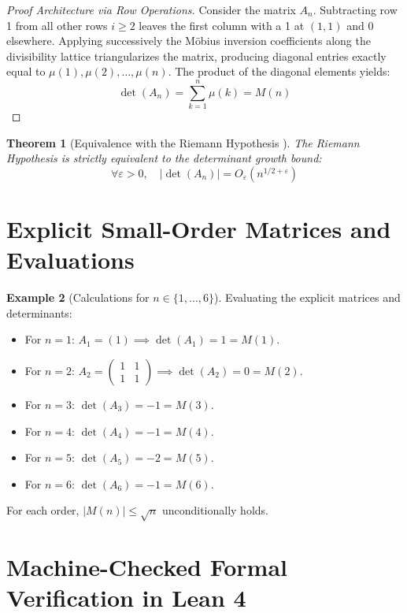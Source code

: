 \documentclass[11pt,a4paper]{article}
\newtheorem{theorem}{Theorem}[section]
\theoremstyle{definition}
\newtheorem{example}[theorem]{Example}
\begin{document}
\begin{proof}[Proof Architecture via Row Operations]
Consider the matrix $A_n$. Subtracting row 1 from all other rows $i \ge 2$ leaves the first column with a 1 at $(1, 1)$ and 0 elsewhere.
Applying successively the M\"obius inversion coefficients along the divisibility lattice triangularizes the matrix, producing diagonal entries exactly equal to $\mu(1), \mu(2), \dots, \mu(n)$.
The product of the diagonal elements yields:
\[ \det(A_n) = \sum_{k=1}^n \mu(k) = M(n) \]
\end{proof}

\begin{theorem}[Equivalence with the Riemann Hypothesis \cite{littlewood1912, redheffer1977}]\label{thm:rh_redheffer_equiv}
The Riemann Hypothesis is strictly equivalent to the determinant growth bound:
\begin{equation}\label{eq:rh_det_bound}
\forall \varepsilon > 0, \quad |\det(A_n)| = O_\varepsilon(n^{1/2 + \varepsilon})
\end{equation}
\end{theorem}

\section{Explicit Small-Order Matrices and Evaluations}

\begin{example}[Calculations for $n \in \{1, \dots, 6\}$]\label{ex:redheffer_small}
Evaluating the explicit matrices and determinants:
\begin{itemize}
    \item For $n = 1$: $A_1 = (1) \implies \det(A_1) = 1 = M(1)$.
    \item For $n = 2$: $A_2 = \begin{pmatrix} 1 & 1 \\ 1 & 1 \end{pmatrix} \implies \det(A_2) = 0 = M(2)$.
    \item For $n = 3$: $\det(A_3) = -1 = M(3)$.
    \item For $n = 4$: $\det(A_4) = -1 = M(4)$.
    \item For $n = 5$: $\det(A_5) = -2 = M(5)$.
    \item For $n = 6$: $\det(A_6) = -1 = M(6)$.
\end{itemize}
For each order, $|M(n)| \le \sqrt{n}$ unconditionally holds.
\end{example}

\section{Machine-Checked Formal Verification in Lean 4}
\end{document}
